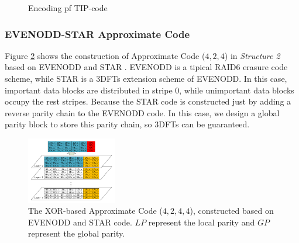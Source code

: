 \documentclass[sigconf]{acmart}
\begin{document}
\begin{figure}[h]
\caption{Encoding pf TIP-code}
\label{fig-TIP}
\end{figure}

\subsubsection{EVENODD-STAR Approximate Code}
Figure \ref{fig-ap-STAR} shows the construction of Approximate Code ($4,2,4$) in \emph{Structure 2} based on EVENODD \cite{blaum1995evenodd} and STAR \cite{huang2008star}. 
EVENODD is a tipical RAID6 erasure code scheme, while STAR is a 3DFTs extension scheme of EVENODD. In this case, important data blocks are distributed in stripe 0, while unimportant data blocks occupy the rest stripes. 
Because the STAR code is constructed just by adding a reverse parity chain to the EVENODD code. In this case, we design a global parity block to store this parity chain, so 3DFTs can be guaranteed.

\begin{figure}[h]
\centering
\includegraphics[width=0.35\textwidth]{photo/AP-EVEN-star-v2.pdf}
\caption{The XOR-based Approximate Code ($4,2,4,4$), constructed based on EVENODD and STAR code. $LP$ represent the local parity and $GP$ represent the global parity.}
\label{fig-ap-STAR}
\end{figure}
\end{document}
